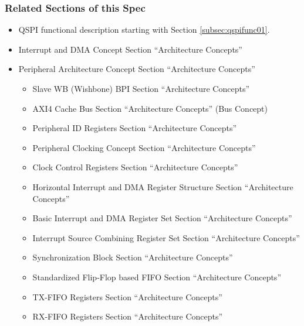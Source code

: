 \subsubsection{Related Sections of this Spec}
\begin{itemize}
  \item QSPI functional description starting with Section \ref{subsec:qspifunc01}.
  \item Interrupt and DMA Concept Section ``Architecture Concepts''
  \item Peripheral Architecture Concept Section ``Architecture Concepts''
  \begin{itemize}
    \item Slave WB (Wishbone) BPI Section ``Architecture Concepts''
    \item AXI4 Cache Bus Section ``Architecture Concepts'' (Bus Concept)
    \item Peripheral ID Registers Section ``Architecture Concepts''
    \item Peripheral Clocking Concept Section ``Architecture Concepts''
    \item Clock Control Registers Section ``Architecture Concepts''
    \item Horizontal Interrupt and DMA Register Structure Section ``Architecture Concepts''
    \item Basic Interrupt and DMA Register Set Section ``Architecture Concepts''
    \item Interrupt Source Combining Register Set Section ``Architecture Concepts''
    \item Synchronization Block Section ``Architecture Concepts''
    \item Standardized Flip-Flop based FIFO Section ``Architecture Concepts''
    \item TX-FIFO Registers Section ``Architecture Concepts''
    \item RX-FIFO Registers Section ``Architecture Concepts''
  \end{itemize}
\end{itemize}

